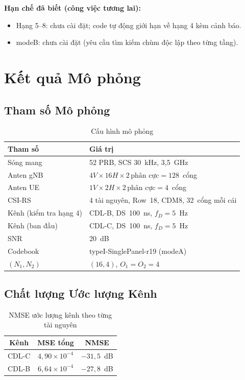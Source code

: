 \documentclass[11pt,a4paper]{article}
\begin{document}
\noindent\textbf{Hạn chế đã biết (công việc tương lai):}
\begin{itemize}
  \item Hạng 5--8: chưa cài đặt; code tự động giới hạn về hạng 4 kèm cảnh báo.
  \item modeB: chưa cài đặt (yêu cầu tìm kiếm chùm độc lập theo từng tầng).
\end{itemize}

\section{Kết quả Mô phỏng}

\subsection{Tham số Mô phỏng}

\begin{table}[H]
\centering
\caption{Cấu hình mô phỏng}
\begin{tabular}{ll}
\toprule
Tham số & Giá trị \\
\midrule
Sóng mang & 52 PRB, SCS 30~kHz, 3,5~GHz \\
Anten gNB & $4V \times 16H \times 2\,\text{phân cực} = 128$~cổng \\
Anten UE & $1V \times 2H \times 2\,\text{phân cực} = 4$~cổng \\
CSI-RS & 4 tài nguyên, Row~18, CDM8, 32~cổng mỗi cái \\
Kênh (kiểm tra hạng 4) & CDL-B, DS~100~ns, $f_D = 5$~Hz \\
Kênh (ban đầu) & CDL-C, DS~100~ns, $f_D = 5$~Hz \\
SNR & 20~dB \\
Codebook & typeI-SinglePanel-r19 (modeA) \\
$(N_1,N_2)$ & $(16,4)$, $O_1=O_2=4$ \\
\bottomrule
\end{tabular}
\end{table}

\subsection{Chất lượng Ước lượng Kênh}

\begin{table}[H]
\centering
\caption{NMSE ước lượng kênh theo từng tài nguyên}
\begin{tabular}{ccc}
\toprule
Kênh & MSE tổng & NMSE \\
\midrule
CDL-C & $4{,}90 \times 10^{-4}$ & $-31{,}5$~dB \\
CDL-B & $6{,}64 \times 10^{-4}$ & $-27{,}8$~dB \\
\bottomrule
\end{tabular}
\end{table}
\end{document}
